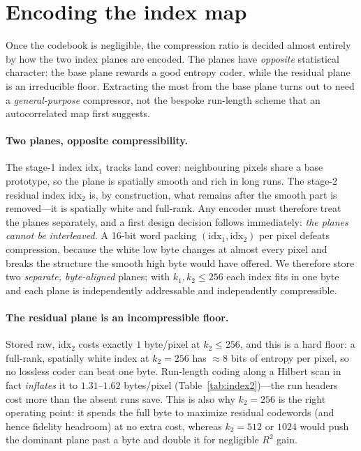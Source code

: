 \documentclass[11pt]{article}
\begin{document}
\section{Encoding the index map}
\label{sec:index}

Once the codebook is negligible, the compression ratio is decided almost entirely
by how the two index planes are encoded. The planes have \emph{opposite}
statistical character: the base plane rewards a good entropy coder, while the
residual plane is an irreducible floor. Extracting the most from the base plane
turns out to need a \emph{general-purpose} compressor, not the bespoke run-length
scheme that an autocorrelated map first suggests.

\paragraph{Two planes, opposite compressibility.}
The stage-1 index $\mathrm{idx}_1$ tracks land cover: neighbouring pixels share a
base prototype, so the plane is spatially smooth and rich in long runs. The
stage-2 residual index $\mathrm{idx}_2$ is, by construction, what remains after
the smooth part is removed---it is spatially white and full-rank. Any encoder must
therefore treat the planes separately, and a first design decision follows
immediately: \emph{the planes cannot be interleaved.} A 16-bit word packing
$(\mathrm{idx}_1,\mathrm{idx}_2)$ per pixel defeats compression, because the white
low byte changes at almost every pixel and breaks the structure the smooth high
byte would have offered. We therefore store two \emph{separate, byte-aligned}
planes; with $k_1,k_2\le256$ each index fits in one byte and each plane is
independently addressable and independently compressible.

\paragraph{The residual plane is an incompressible floor.}
Stored raw, $\mathrm{idx}_2$ costs exactly $1$ byte/pixel at $k_2\le256$, and this
is a hard floor: a full-rank, spatially white index at $k_2=256$ has ${\approx}8$
bits of entropy per pixel, so no lossless coder can beat one byte. Run-length
coding along a Hilbert scan in fact \emph{inflates} it to $1.31$--$1.62$
bytes/pixel (Table~\ref{tab:index2})---the run headers cost more than the absent
runs save. This is also why $k_2=256$ is the right operating point: it spends the
full byte to maximize residual codewords (and hence fidelity headroom) at no extra
cost, whereas $k_2=512$ or $1024$ would push the dominant plane past a byte and
double it for negligible $R^2$ gain.
\end{document}
